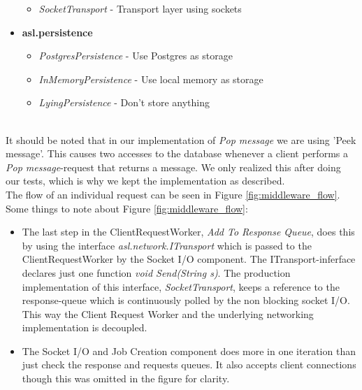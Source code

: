 \documentclass{article}
\begin{document}
\begin{itemize}
\begin{itemize}
                    \item \textit{SocketTransport} - Transport layer using sockets
                \end{itemize}
                \item \textbf{asl.persistence}
                \begin{itemize}
                    \item \textit{PostgresPersistence} - Use Postgres as storage
                    \item \textit{InMemoryPersistence} - Use local memory as storage
                    \item \textit{LyingPersistence} - Don't store anything
                \end{itemize}
            \end{itemize}
            ~\\
            It should be noted that in our implementation of \textit{Pop message} we are using 'Peek message'. This causes two accesses to the database whenever a client performs a \textit{Pop message}-request that returns a message. We only realized this after doing our tests, which is why we kept the implementation as described.\\

            The flow of an individual request can be seen in Figure \ref{fig:middleware_flow}. Some things to note about Figure \ref{fig:middleware_flow}:

            \begin{itemize}
                \item The last step in the ClientRequestWorker, \textit{Add To Response Queue}, does this by using the interface \textit{asl.network.ITransport} which is passed to the ClientRequestWorker by the Socket I/O component. The ITransport-inferface declares just one function \textit{void Send(String s)}. The production implementation of this interface, \textit{SocketTransport}, keeps a reference to the response-queue which is continuously polled by the non blocking socket I/O. This way the Client Request Worker and the underlying networking implementation is decoupled.

                \item The Socket I/O and Job Creation component does more in one iteration than just check the response and requests queues. It also accepts client connections though this was omitted in the figure for clarity.
            \end{itemize}
\end{document}
